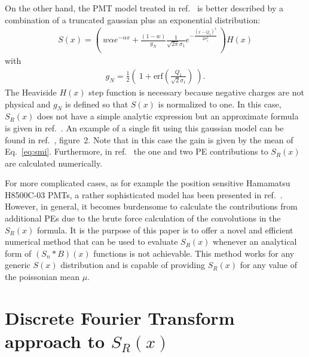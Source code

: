 \documentclass[a4paper,11pt]{article}
\begin{document}
On the other hand, the PMT model treated in ref.~\cite{Smirnov} is better described by a combination of a truncated gaussian plus an exponential distribution:
\begin{align}
S(x) =    \left( \ w \alpha e^{-\alpha x } + \frac{(1-w)}{g_N} \frac{1}{\sqrt{2\pi}\sigma_1} e^{ - \frac{( x - Q_1 )^2}{2\sigma_1^2}} \ \right) H( x )
\label{eq:smi}
\end{align}
with 
\begin{align}
g_N =  \frac{1}{2} \left(  \    1 +  \text{erf} \left( \frac{Q_1}{\sqrt{2}\sigma_1 } \right) \   \right). 
\end{align}
The Heaviside $H(x)$ step function is necessary because negative charges are not physical and $g_N$ is defined so that $S(x)$ is normalized to one. 
In this case, $S_R(x)$ does not have a simple analytic expression but an approximate formula is given in ref.~\cite{Smirnov}. 
An example of a single fit using this gaussian model can be found in ref.~\cite{darkside}, figure~2. Note that in this case the gain is given by the mean of Eq.~\eqref{eq:smi}. 
Furthermore, in ref.~\cite{darkside} %
the one and two PE contributions to $S_R(x)$ are calculated numerically. 

For more complicated cases, as for example the position sensitive Hamamatsu H8500C-03 PMTs, a rather sophisticated model has been presented in ref.~\cite{pavel}.
However, in general, it becomes burdensome to calculate the contributions from additional PEs due to the brute force calculation of the convolutions in the $S_R(x)$ formula. 
It is the purpose of this paper is to offer a novel and efficient numerical method that can be used to evaluate $S_R(x)$ 
whenever an analytical form of $(S_n*B)(x)$ functions is not  achievable. 
This method works for any generic $S(x)$ distribution and is capable of providing $S_R(x)$ for any value of the poissonian mean $\mu$.


\section{Discrete Fourier Transform approach to $S_R(x)$}
\label{sec:dft}
\end{document}

